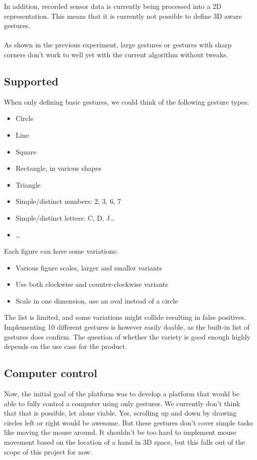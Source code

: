 \documentclass[a4paper]{article}
\providecommand{\tightlist}{%
\setlength{\itemsep}{0pt}\setlength{\parskip}{0pt}}
\begin{document}
  In addition, recorded sensor data is currently being processed into a 2D
  representation. This means that it is currently not possible to define 3D
  aware gestures.

  \paragraph{}
  As shown in the previous experiment, large gestures or gestures with sharp
  corners don't work to well yet with the current algorithm without tweaks.

  \subsection{Supported}
  When only defining basic gestures, we could think of the following gesture
  types:

  \begin{itemize}
    \tightlist
    \item Circle
    \item Line
    \item Square
    \item Rectangle, in various shapes
    \item Triangle
    \item Simple/distinct numbers: 2, 3, 6, 7
    \item Simple/distinct letters: C, D, J\dots
    \item \dots
  \end{itemize}

  Each figure can have some variations:
  \begin{itemize}
    \tightlist
    \item Various figure scales, larger and smaller variants
    \item Use both clockwise and counter-clockwise variants
    \item Scale in one dimension, use an oval instead of a circle
  \end{itemize}

  The list is limited, and some variations might collide resulting in false
  positives. Implementing 10 different gestures is however easily doable, as the
  built-in list of gestures does confirm. The question of whether the variety is
  good enough highly depends on the use case for the product.

  \subsection{Computer control}
  Now, the initial goal of the platform was to develop a platform that would be
  able to fully control a computer using only gestures. We currently don't think
  that that is possible, let alone viable.
  Yes, scrolling up and down by drawing circles left or right would be awesome.
  But these gestures don't cover simple tasks like moving the mouse around.
  It shouldn't be too hard to implement mouse movement based on the location of
  a hand in 3D space, but this falls out of the scope of this project for now.
\end{document}
